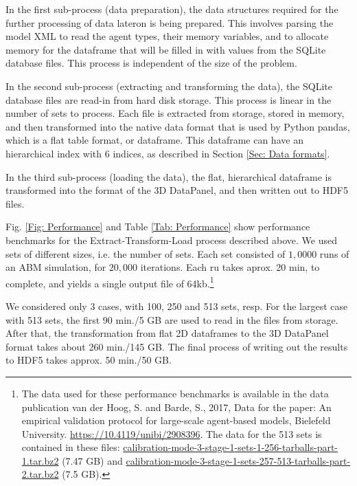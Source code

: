 \documentclass[10pt,a4paper]{article}
\begin{document}
In the first sub-process (data preparation), the data structures required for the further processing of data lateron is being prepared. This involves parsing the model XML to read the agent types, their memory variables, and to allocate memory for the dataframe that will be filled in with values from the SQLite database files. This process is independent of the size of the problem.

In the second sub-process (extracting and transforming the data), the SQLite database files are read-in from hard disk storage. This process is linear in the number of sets to process. Each file is extracted from storage, stored in memory, and then transformed into the native data format that is used by Python pandas, which is a flat table format, or dataframe. This dataframe can have an hierarchical index with 6 indices, as described in Section \ref{Sec: Data formats}.

In the third sub-process (loading the data), the flat, hierarchical dataframe is transformed into the format of the 3D DataPanel, and then written out to HDF5 files.

Fig. \ref{Fig: Performance} and Table \ref{Tab: Performance} show performance benchmarks for the Extract-Transform-Load process described above. We used sets of different sizes, i.e. the number of sets. Each set consisted of $1,0000$ runs of an ABM simulation, for $20,000$ iterations. Each ru takes aprox. 20 min, to complete, and yields a single output file of 64kb.\footnote{The data used for these performance benchmarks is available in the data publication van der Hoog, S. and Barde, S., 2017, Data for the paper: An empirical validation protocol for large-scale agent-based models, Bielefeld University.  \url{https://10.4119/unibi/2908396}. The data for the 513 sets is contained in these files:
\url{calibration-mode-3-stage-1-sets-1-256-tarballs-part-1.tar.bz2} (7.47 GB) and \url{calibration-mode-3-stage-1-sets-257-513-tarballs-part-2.tar.bz2} (7.5 GB).}

We considered only 3 cases, with 100, 250 and 513 sets, resp. For the largest case with 513 sets, the first 90 min./5 GB are used to read in the files from storage. After that, the transformation from flat 2D dataframes to the 3D DataPanel format takes about 260 min./145 GB. The final process of writing out the results to HDF5 takes approx. 50 min./50 GB.
\end{document}
